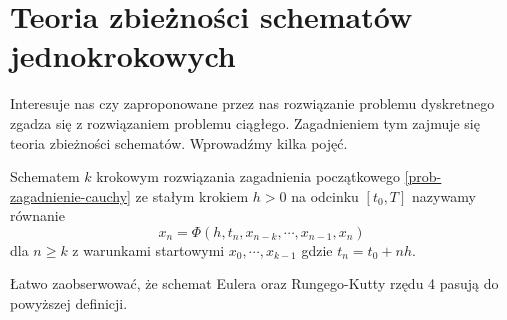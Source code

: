 \documentclass[12pt,a4paper]{report}
\begin{document}
\section{Teoria zbieżności schematów jednokrokowych}
Interesuje nas czy zaproponowane przez nas rozwiązanie problemu dyskretnego zgadza się z rozwiązaniem problemu ciągłego. Zagadnieniem tym zajmuje się teoria zbieżności schematów. Wprowadźmy kilka pojęć. 

\begin{definition}
Schematem $k$ krokowym rozwiązania zagadnienia początkowego \ref{prob-zagadnienie-cauchy} ze stałym krokiem $h>0$ na odcinku $[t_0,T]$ nazywamy równanie
$$
x_n = \Phi (h,t_n,x_{n-k},\cdots,x_{n-1},x_n) \label{k-steps-scheme}
$$
dla $ n \geq k$ z warunkami startowymi $x_0,\cdots, x_{k-1}$ gdzie $t_n = t_0 + nh$.
\end{definition}
Łatwo zaobserwować, że schemat Eulera oraz Rungego-Kutty rzędu 4 pasują do powyższej definicji. 
\end{document}
